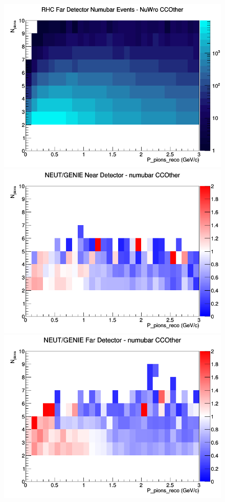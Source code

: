 \documentclass[12pt]{article}
\begin{document}
\begin{figure}[h]
\endminipage
{}
\includegraphics[width=\linewidth]{eff_N_P/FGT/pions/CCOther_RHC_FD_numubar_N_P_NuWro.png}
\endminipage
\newline
{}
\includegraphics[width=\linewidth]{eff_N_P/FGT/pions/ratios/CCOther_NEUT_GENIE_numubar_near_N_P.png}
\endminipage
{}
\includegraphics[width=\linewidth]{eff_N_P/FGT/pions/ratios/CCOther_NEUT_GENIE_numubar_far_N_P.png}

\end{figure}
\end{document}
